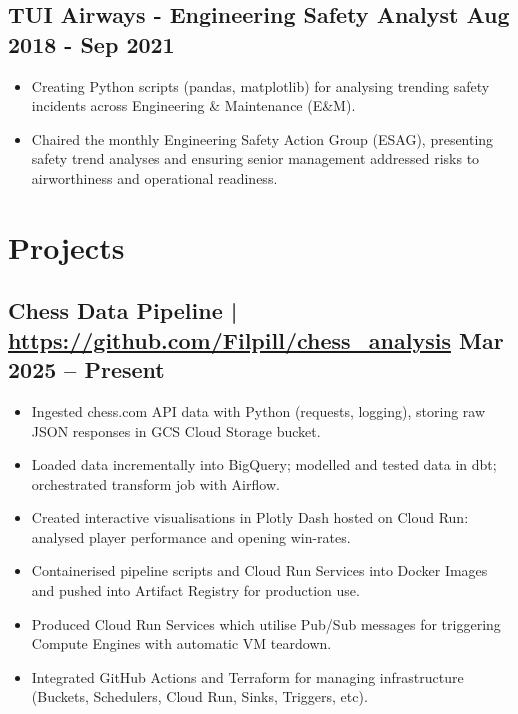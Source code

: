 \documentclass[a4paper, 10pt]{article}
\begin{document}
\subsection*{\textbf{TUI Airways - Engineering Safety Analyst} \hfill  Aug 2018 - Sep 2021}
\begin{itemize}[noitemsep]
  \item Creating Python scripts (pandas, matplotlib) for analysing trending safety incidents across Engineering \& Maintenance (E\&M).
  \item Chaired the monthly Engineering Safety Action Group (ESAG), presenting safety trend analyses and ensuring senior management addressed risks to airworthiness and operational readiness.
\end{itemize}
\vspace{-4.5mm}

\section*{Projects}
\vspace{-2.5mm}

\subsection*{\textbf{Chess Data Pipeline} | \url{https://github.com/Filpill/chess_analysis} \hfill  Mar 2025 – Present}
\begin{itemize}[noitemsep]
  \item Ingested chess.com API data with Python (requests, logging), storing raw JSON responses in GCS Cloud Storage bucket.
  \item Loaded data incrementally into BigQuery; modelled and tested data in dbt; orchestrated transform job with Airflow.
  \item Created interactive visualisations in Plotly Dash hosted on Cloud Run: analysed player performance and opening win-rates.
  \item Containerised pipeline scripts and Cloud Run Services into Docker Images and pushed into Artifact Registry for production use.
  \item Produced Cloud Run Services which utilise Pub/Sub messages for triggering Compute Engines with automatic VM teardown.
  \item Integrated GitHub Actions and Terraform for managing infrastructure (Buckets, Schedulers, Cloud Run, Sinks, Triggers, etc).
\end{itemize}
\vspace{-4.5mm}
\end{document}

